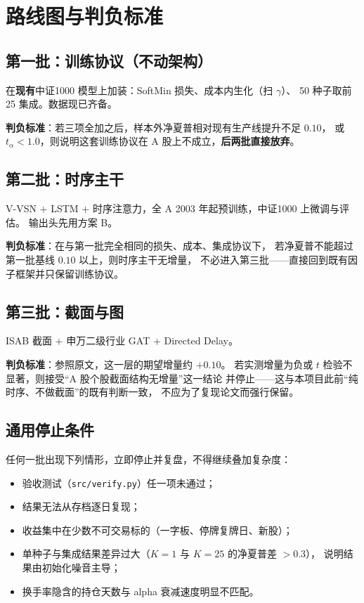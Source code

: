 \documentclass[11pt, a4paper]{ctexart}
\newcommand{\file}[1]{\texttt{\small #1}}
\begin{document}
\section{路线图与判负标准}

\subsection{第一批：训练协议（不动架构）}
在\textbf{现有}中证1000 模型上加装：SoftMin 损失、成本内生化（扫 $\gamma$）、
50 种子取前 25 集成。数据现已齐备。

\textbf{判负标准}：若三项全加之后，样本外净夏普相对现有生产线提升不足 $0.10$，
或 $t_\alpha < 1.0$，则说明这套训练协议在 A 股上不成立，\textbf{后两批直接放弃}。

\subsection{第二批：时序主干}
V-VSN $+$ LSTM $+$ 时序注意力，全 A 2003 年起预训练，中证1000 上微调与评估。
输出头先用方案 B。

\textbf{判负标准}：在与第一批完全相同的损失、成本、集成协议下，
若净夏普不能超过第一批基线 $0.10$ 以上，则时序主干无增量，
不必进入第三批——直接回到既有因子框架并只保留训练协议。

\subsection{第三批：截面与图}
ISAB 截面 $+$ 申万二级行业 GAT $+$ Directed Delay。

\textbf{判负标准}：参照原文，这一层的期望增量约 $+0.10$。
若实测增量为负或 $t$ 检验不显著，则接受“A 股个股截面结构无增量”这一结论
并停止——这与本项目此前“纯时序、不做截面”的既有判断一致，
不应为了复现论文而强行保留。

\subsection{通用停止条件}
任何一批出现下列情形，立即停止并复盘，不得继续叠加复杂度：
\begin{itemize}
  \item 验收测试（\file{src/verify.py}）任一项未通过；
  \item 结果无法从存档逐日复现；
  \item 收益集中在少数不可交易标的（一字板、停牌复牌日、新股）；
  \item 单种子与集成结果差异过大（$K{=}1$ 与 $K{=}25$ 的净夏普差 $>0.3$），
        说明结果由初始化噪音主导；
  \item 换手率隐含的持仓天数与 alpha 衰减速度明显不匹配。
\end{itemize}
\end{document}
